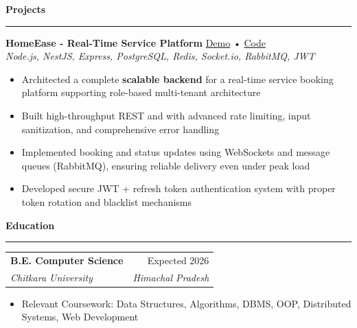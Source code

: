 \documentclass[10pt, letterpaper]{article}
\makeatletter
\newcommand{\resumesection}[1]{
    \vspace{6pt}
    {\large \textbf{\textcolor{accent}{#1}}}
    \vspace{1pt}\hrule
    \vspace{4pt}
}
\newcommand{\experience}[4]{
    \begin{tabularx}{\textwidth}{@{} X r @{}}
        \textbf{#1} & #2 \\
        \textit{#3} & \textit{#4} \\
    \end{tabularx}
}
\newcommand{\project}[4]{
    \vspace{2pt}
    \textbf{#1} \hfill \href{#3}{\faIcon{globe} Demo} • \href{#4}{\faIcon{github} Code} \\
    \textit{\small #2}
    \vspace{1pt}
}
\makeatother
\begin{document}
\resumesection{Projects}
\project{HomeEase - Real-Time Service Platform}{Node.js, NestJS, Express, PostgreSQL, Redis, Socket.io, RabbitMQ, JWT}{https://homeease-oa77.onrender.com/}{https://github.com/SharadJ19/homeease}
\begin{itemize}
    \item Architected a complete \textbf{scalable backend} for a real-time service booking platform supporting role-based multi-tenant architecture
   
    \item Built high-throughput REST and with advanced rate limiting, input sanitization, and comprehensive error handling
   
    \item Implemented booking and status updates using WebSockets and message queues (RabbitMQ), ensuring reliable delivery even under peak load
   
    \item Developed secure JWT + refresh token authentication system with proper token rotation and blacklist mechanisms
   
\end{itemize}

\resumesection{Education}
\experience{B.E. Computer Science}{Expected 2026}{Chitkara University}{Himachal Pradesh}
\vspace{-6pt}
\begin{itemize}
    \item Relevant Coursework: Data Structures, Algorithms, DBMS, OOP, Distributed Systems, Web Development
\end{itemize}
\end{document}

